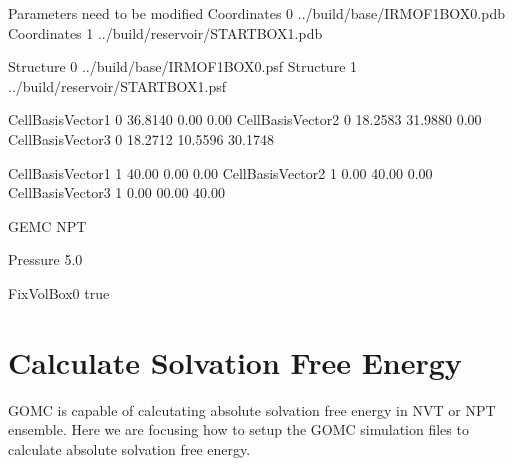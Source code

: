 \documentclass[letterpaper,10pt,english]{sphinxmanual}
\begin{document}
\begin{sphinxVerbatim}[commandchars=\\\{\}]
\PYGZsh{}\PYGZsh{}\PYGZsh{}\PYGZsh{}\PYGZsh{}\PYGZsh{}\PYGZsh{}\PYGZsh{}\PYGZsh{}\PYGZsh{}\PYGZsh{}\PYGZsh{}\PYGZsh{}\PYGZsh{}\PYGZsh{}\PYGZsh{}\PYGZsh{}\PYGZsh{}\PYGZsh{}\PYGZsh{}\PYGZsh{}\PYGZsh{}\PYGZsh{}\PYGZsh{}\PYGZsh{}\PYGZsh{}\PYGZsh{}\PYGZsh{}\PYGZsh{}\PYGZsh{}\PYGZsh{}\PYGZsh{}\PYGZsh{}\PYGZsh{}\PYGZsh{}\PYGZsh{}\PYGZsh{}\PYGZsh{}\PYGZsh{}\PYGZsh{}\PYGZsh{}\PYGZsh{}\PYGZsh{}\PYGZsh{}\PYGZsh{}\PYGZsh{}\PYGZsh{}\PYGZsh{}\PYGZsh{}\PYGZsh{}\PYGZsh{}\PYGZsh{}\PYGZsh{}\PYGZsh{}\PYGZsh{}\PYGZsh{}
\PYGZsh{} Parameters need to be modified
\PYGZsh{}\PYGZsh{}\PYGZsh{}\PYGZsh{}\PYGZsh{}\PYGZsh{}\PYGZsh{}\PYGZsh{}\PYGZsh{}\PYGZsh{}\PYGZsh{}\PYGZsh{}\PYGZsh{}\PYGZsh{}\PYGZsh{}\PYGZsh{}\PYGZsh{}\PYGZsh{}\PYGZsh{}\PYGZsh{}\PYGZsh{}\PYGZsh{}\PYGZsh{}\PYGZsh{}\PYGZsh{}\PYGZsh{}\PYGZsh{}\PYGZsh{}\PYGZsh{}\PYGZsh{}\PYGZsh{}\PYGZsh{}\PYGZsh{}\PYGZsh{}\PYGZsh{}\PYGZsh{}\PYGZsh{}\PYGZsh{}\PYGZsh{}\PYGZsh{}\PYGZsh{}\PYGZsh{}\PYGZsh{}\PYGZsh{}\PYGZsh{}\PYGZsh{}\PYGZsh{}\PYGZsh{}\PYGZsh{}\PYGZsh{}\PYGZsh{}\PYGZsh{}\PYGZsh{}\PYGZsh{}\PYGZsh{}\PYGZsh{}
Coordinates     0   ../build/base/IRMOF\PYGZus{}1\PYGZus{}BOX\PYGZus{}0.pdb
Coordinates     1   ../build/reservoir/START\PYGZus{}BOX\PYGZus{}1.pdb

Structure       0   ../build/base/IRMOF\PYGZus{}1\PYGZus{}BOX\PYGZus{}0.psf
Structure       1   ../build/reservoir/START\PYGZus{}BOX\PYGZus{}1.psf

CellBasisVector1    0   36.8140   0.00     0.00
CellBasisVector2    0   18.2583  31.9880   0.00
CellBasisVector3    0   18.2712  10.5596  30.1748

CellBasisVector1    1   40.00     0.00    0.00
CellBasisVector2    1    0.00    40.00    0.00
CellBasisVector3    1    0.00    00.00   40.00

GEMC        NPT

Pressure    5.0

FixVolBox0  true
\end{sphinxVerbatim}


\section{Calculate Solvation Free Energy}
\label{\detokenize{howto:calculate-solvation-free-energy}}
\sphinxAtStartPar
GOMC is capable of calcutating absolute solvation free energy in NVT or NPT ensemble. Here
we are focusing how to setup the GOMC simulation files to calculate absolute solvation free energy.
\end{document}

